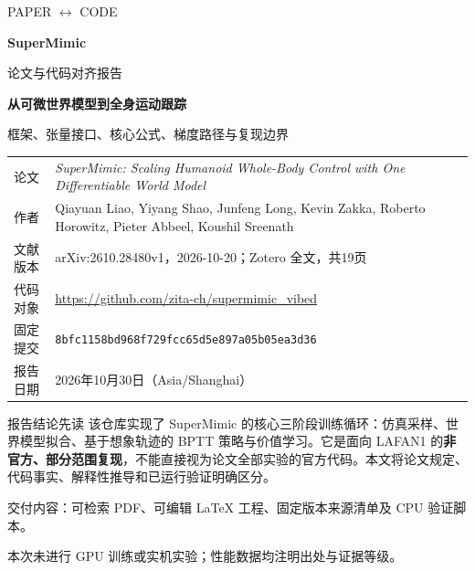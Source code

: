 \documentclass[UTF8,fontset=fandol,a4paper,11pt]{ctexart}
\begin{document}
\hypersetup{pageanchor=false}
\begin{titlepage}
\thispagestyle{empty}
\vspace*{2mm}
{\color{white}\sffamily\large PAPER $\leftrightarrow$ CODE\par}
\vspace{7mm}
{\color{white}\Huge\bfseries SuperMimic\par}
\vspace{3mm}
{\color{white}\LARGE 论文与代码对齐报告\par}
\vspace{28mm}
{\Large\bfseries 从可微世界模型到全身运动跟踪\par}
\vspace{4mm}
{\large 框架、张量接口、核心公式、梯度路径与复现边界\par}
\vspace{9mm}
\noindent\begin{tabularx}{\textwidth}{@{}P{27mm}Y@{}}
\toprule
论文 & \textit{SuperMimic: Scaling Humanoid Whole-Body Control with One Differentiable World Model}\\
作者 & Qiayuan Liao, Yiyang Shao, Junfeng Long, Kevin Zakka, Roberto Horowitz, Pieter Abbeel, Koushil Sreenath\\
文献版本 & arXiv:2610.28480v1，2026-10-20；Zotero 全文，共19页\\
代码对象 & \url{https://github.com/zita-ch/supermimic_vibed}\\
固定提交 & \texttt{8bfc1158bd968f729fcc65d5e897a05b05ea3d36}\\
报告日期 & 2026年10月30日（Asia/Shanghai）\\
\bottomrule
\end{tabularx}
\vspace{8mm}
\begin{insight}{报告结论先读}
该仓库实现了 SuperMimic 的核心三阶段训练循环：仿真采样、世界模型拟合、基于想象轨迹的 BPTT 策略与价值学习。它是面向 LAFAN1 的\textbf{非官方、部分范围复现}，不能直接视为论文全部实验的官方代码。本文将论文规定、代码事实、解释性推导和已运行验证明确区分。
\end{insight}
\vfill
{\small 交付内容：可检索 PDF、可编辑 LaTeX 工程、固定版本来源清单及 CPU 验证脚本。\par}
{\small 本次未进行 GPU 训练或实机实验；性能数据均注明出处与证据等级。\par}
\end{titlepage}
\end{document}
